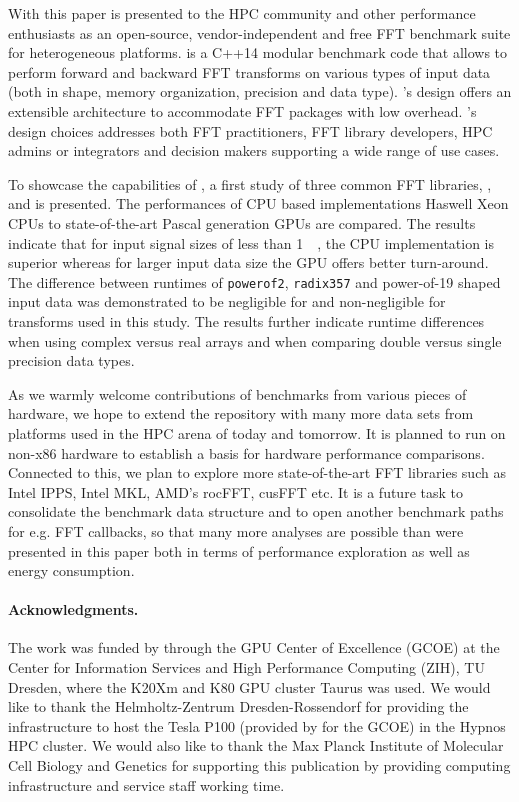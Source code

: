 
With this paper \gearshifft{} is presented to the HPC community and other performance enthusiasts as an open-source, vendor-independent and free FFT benchmark suite for heterogeneous platforms. \gearshifft{} is a C++14 modular benchmark code that allows to perform forward and backward FFT transforms on various types of input data (both in shape, memory organization, precision and data type). \gearshifft{}'s design offers an extensible architecture to accommodate FFT packages with low overhead. \gearshifft{}'s design choices addresses both FFT practitioners, FFT library developers, HPC admins or integrators and decision makers supporting a wide range of use cases. 

To showcase the capabilities of \gearshifft{}, a first study of three common FFT libraries, \fftw{}, \clfft{} and \cufft{} is presented. The performances of CPU based implementations Haswell Xeon CPUs to state-of-the-art Pascal generation \nvidia{} GPUs are compared. The results indicate that for input signal sizes of less than \SI{1}{\mebi\byte}, the CPU implementation is superior whereas for larger input data size the GPU offers better turn-around. The difference between runtimes of \texttt{powerof2}, \texttt{radix357} and power-of-19 shaped input data was demonstrated to be negligible for \fftw{} and non-negligible for \cufft{} transforms used in this study. The results further indicate runtime differences when using complex versus real arrays and when comparing double versus single precision data types.     

As we warmly welcome contributions of benchmarks from various pieces of hardware, we hope to extend the \gearshifft{} repository with many more data sets from platforms used in the HPC arena of today and tomorrow. It is planned to run \gearshifft{} on non-x86 hardware to establish a basis for hardware performance comparisons. Connected to this, we plan to explore more state-of-the-art FFT libraries such as Intel IPPS, Intel MKL, AMD's rocFFT, cusFFT etc. It is a future task to consolidate the benchmark data structure and to open another benchmark paths for e.g. FFT callbacks, so that many more analyses are possible than were presented in this paper both in terms of performance exploration as well as energy consumption.

\paragraph{Acknowledgments.} The work was funded by \nvidia{} through the GPU Center of Excellence (GCOE) at the Center for Information Services and High Performance Computing (ZIH), TU Dresden, where the K20Xm and K80 GPU cluster Taurus was used. We would like to thank the Helmholtz-Zentrum Dresden-Rossendorf for providing the infrastructure to host the \nvidia{} Tesla P100 (provided by \nvidia{} for the GCOE) in the Hypnos HPC cluster. We would also like to thank the Max Planck Institute of Molecular Cell Biology and Genetics for supporting this publication by providing computing infrastructure and service staff working time.
